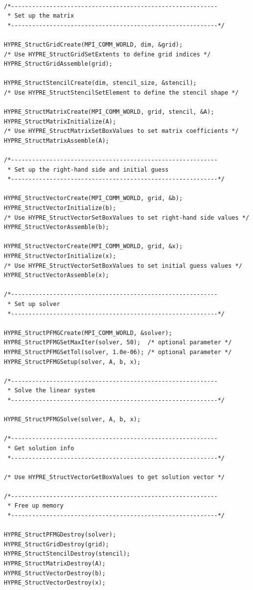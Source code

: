 \begin{display}
\begin{verbatim}

/*-----------------------------------------------------------
 * Set up the matrix
 *-----------------------------------------------------------*/

HYPRE_StructGridCreate(MPI_COMM_WORLD, dim, &grid);
/* Use HYPRE_StructGridSetExtents to define grid indices */
HYPRE_StructGridAssemble(grid);
	
HYPRE_StructStencilCreate(dim, stencil_size, &stencil);
/* Use HYPRE_StructStencilSetElement to define the stencil shape */

HYPRE_StructMatrixCreate(MPI_COMM_WORLD, grid, stencil, &A);
HYPRE_StructMatrixInitialize(A);
/* Use HYPRE_StructMatrixSetBoxValues to set matrix coefficients */
HYPRE_StructMatrixAssemble(A);

/*-----------------------------------------------------------
 * Set up the right-hand side and initial guess
 *-----------------------------------------------------------*/

HYPRE_StructVectorCreate(MPI_COMM_WORLD, grid, &b);
HYPRE_StructVectorInitialize(b);
/* Use HYPRE_StructVectorSetBoxValues to set right-hand side values */
HYPRE_StructVectorAssemble(b);

HYPRE_StructVectorCreate(MPI_COMM_WORLD, grid, &x);
HYPRE_StructVectorInitialize(x);
/* Use HYPRE_StructVectorSetBoxValues to set initial guess values */
HYPRE_StructVectorAssemble(x);

/*-----------------------------------------------------------
 * Set up solver
 *-----------------------------------------------------------*/

HYPRE_StructPFMGCreate(MPI_COMM_WORLD, &solver);
HYPRE_StructPFMGSetMaxIter(solver, 50);  /* optional parameter */
HYPRE_StructPFMGSetTol(solver, 1.0e-06); /* optional parameter */
HYPRE_StructPFMGSetup(solver, A, b, x);

/*-----------------------------------------------------------
 * Solve the linear system
 *-----------------------------------------------------------*/

HYPRE_StructPFMGSolve(solver, A, b, x);

/*-----------------------------------------------------------
 * Get solution info
 *-----------------------------------------------------------*/

/* Use HYPRE_StructVectorGetBoxValues to get solution vector */

/*-----------------------------------------------------------
 * Free up memory
 *-----------------------------------------------------------*/

HYPRE_StructPFMGDestroy(solver);
HYPRE_StructGridDestroy(grid);
HYPRE_StructStencilDestroy(stencil);
HYPRE_StructMatrixDestroy(A);
HYPRE_StructVectorDestroy(b);
HYPRE_StructVectorDestroy(x);

\end{verbatim}
\end{display}

